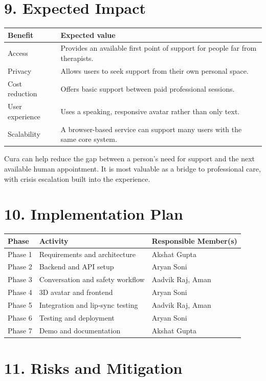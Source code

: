 \documentclass[9pt,a4paper]{article}
\begin{document}
\section*{9. Expected Impact}

\begin{tabularx}{\textwidth}{@{}p{3.2cm}Y@{}}
\textbf{Benefit} & \textbf{Expected value} \\
\hline
Access & Provides an available first point of support for people far from
therapists. \\
Privacy & Allows users to seek support from their own personal space. \\
Cost reduction & Offers basic support between paid professional sessions. \\
User experience & Uses a speaking, responsive avatar rather than only text. \\
Scalability & A browser-based service can support many users with the same core
system. \\
\end{tabularx}

Cura can help reduce the gap between a person's need for support and the next
available human appointment. It is most valuable as a bridge to professional
care, with crisis escalation built into the experience.

\section*{10. Implementation Plan}

\begin{tabularx}{\textwidth}{@{}p{3cm}Yp{3.2cm}@{}}
\textbf{Phase} & \textbf{Activity} & \textbf{Responsible Member(s)} \\
\hline
Phase 1 & Requirements and architecture & Akshat Gupta \\
Phase 2 & Backend and API setup & Aryan Soni \\
Phase 3 & Conversation and safety workflow & Aadvik Raj, Aman \\
Phase 4 & 3D avatar and frontend & Aryan Soni \\
Phase 5 & Integration and lip-sync testing & Aadvik Raj, Aman \\
Phase 6 & Testing and deployment & Aryan Soni \\
Phase 7 & Demo and documentation & Akshat Gupta \\
\end{tabularx}

\section*{11. Risks and Mitigation}
\end{document}
